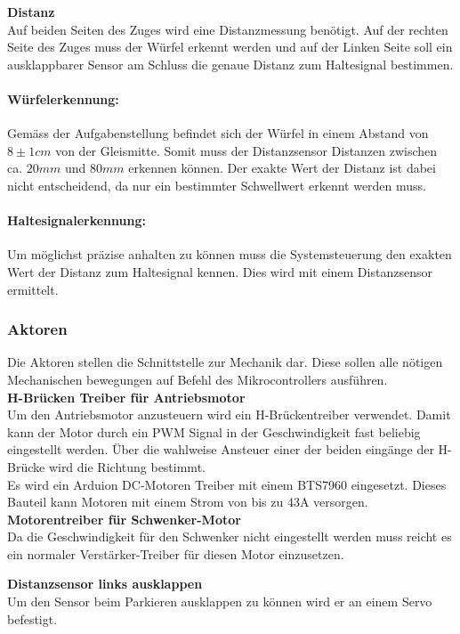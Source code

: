 \documentclass[../../main.tex]{subfiles}
\begin{document}
    \textbf{Distanz}\\
    Auf beiden Seiten des Zuges wird eine Distanzmessung benötigt. Auf der rechten Seite des Zuges muss der Würfel erkennt werden und auf der Linken Seite soll ein ausklappbarer Sensor am Schluss die genaue Distanz zum Haltesignal bestimmen.

    \paragraph{Würfelerkennung:}
    Gemäss der Aufgabenstellung befindet sich der Würfel in einem Abstand von $8\pm1cm$ von der Gleismitte. Somit muss der Distanzsensor Distanzen zwischen ca. $20mm$ und $80mm$ erkennen können. Der exakte Wert der Distanz ist dabei nicht entscheidend, da nur ein bestimmter Schwellwert erkennt werden muss.

    \paragraph{Haltesignalerkennung:}
    Um möglichst präzise anhalten zu können muss die Systemsteuerung den exakten Wert der Distanz zum Haltesignal kennen. Dies wird mit einem Distanzsensor ermittelt.\\
    
    \subsubsection{Aktoren}
    Die Aktoren stellen die Schnittstelle zur Mechanik dar. Diese sollen alle nötigen Mechanischen bewegungen auf Befehl des Mikrocontrollers ausführen.\\

    \textbf{H-Brücken Treiber für Antriebsmotor}\\
    Um den Antriebsmotor anzusteuern wird ein H-Brückentreiber verwendet. Damit kann der Motor durch ein PWM Signal in der Geschwindigkeit fast beliebig eingestellt werden. Über die wahlweise Ansteuer einer der beiden eingänge der H-Brücke wird die Richtung bestimmt.\\
    Es wird ein Arduion DC-Motoren Treiber mit einem BTS7960 eingesetzt. Dieses Bauteil kann Motoren mit einem Strom von bis zu 43A versorgen. \\

    \textbf{Motorentreiber für Schwenker-Motor}\\
    Da die Geschwindigkeit für den Schwenker nicht eingestellt werden muss reicht es ein normaler Verstärker-Treiber für diesen Motor einzusetzen.

    \textbf{Distanzsensor links ausklappen}\\
    Um den Sensor beim Parkieren ausklappen zu können wird er an einem Servo befestigt.\\

    
\end{document}
